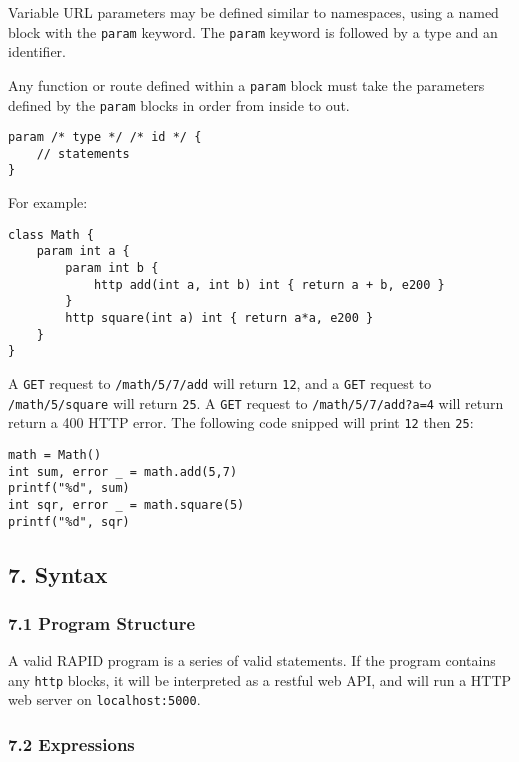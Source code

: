 \documentclass[]{article}
\begin{document}
Variable URL parameters may be defined similar to namespaces, using a
named block with the \texttt{param} keyword. The \texttt{param} keyword
is followed by a type and an identifier.

Any function or route defined within a \texttt{param} block must take
the parameters defined by the \texttt{param} blocks in order from inside
to out.

\begin{verbatim}
param /* type */ /* id */ {
    // statements
}
\end{verbatim}

For example:

\begin{verbatim}
class Math {
    param int a {
        param int b {
            http add(int a, int b) int { return a + b, e200 }
        }   
        http square(int a) int { return a*a, e200 }
    }
}
\end{verbatim}

A \texttt{GET} request to \texttt{/math/5/7/add} will return
\texttt{12}, and a \texttt{GET} request to \texttt{/math/5/square} will
return \texttt{25}. A \texttt{GET} request to \texttt{/math/5/7/add?a=4}
will return return a 400 HTTP error. The following code snipped will
print \texttt{12} then \texttt{25}:

\begin{verbatim}
math = Math()
int sum, error _ = math.add(5,7)
printf("%d", sum)
int sqr, error _ = math.square(5)
printf("%d", sqr)
\end{verbatim}

\subsection{7. Syntax}\label{syntax}

\subsubsection{7.1 Program Structure}\label{program-structure}

A valid RAPID program is a series of valid statements. If the program
contains any \texttt{http} blocks, it will be interpreted as a restful
web API, and will run a HTTP web server on \texttt{localhost:5000}.

\subsubsection{7.2 Expressions}\label{expressions}
\end{document}
